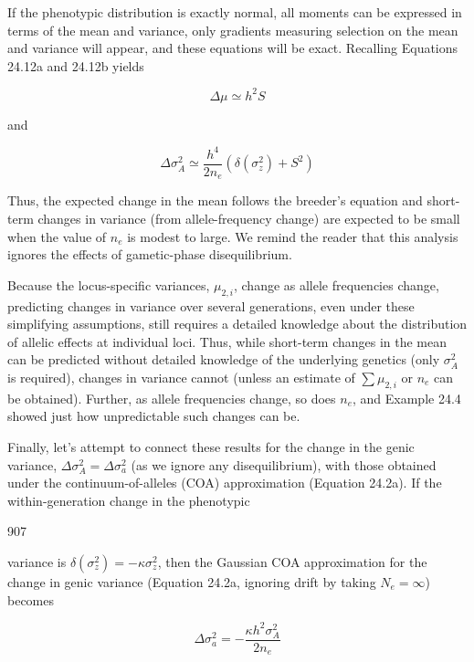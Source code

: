 \documentclass{article}
\begin{document}
If the phenotypic distribution is exactly normal, all moments can be expressed in terms of the mean and variance, only gradients measuring selection on the mean and variance will appear, and these equations will be exact. Recalling Equations 24.12a and 24.12b yields

\begin{equation}
\Delta\mu\simeq h^{2}S
\tag{24.30b}
\label{eq:24_30b}
\end{equation}

and

\begin{equation}
\Delta\sigma_{A}^{2}\simeq\frac{h^{4}}{2n_{e}}\left(\delta(\sigma_{z}^{2})+S^{2}\right)
\tag{24.30c}
\label{eq:24_30c}
\end{equation}

Thus, the expected change in the mean follows the breeder's equation and short-term changes in variance (from allele-frequency change) are expected to be small when the value of  $ n_{e} $ is modest to large. We remind the reader that this analysis ignores the effects of gametic-phase disequilibrium.

Because the locus-specific variances,  $ \mu_{2,i} $, change as allele frequencies change, predicting changes in variance over several generations, even under these simplifying assumptions, still requires a detailed knowledge about the distribution of allelic effects at individual loci. Thus, while short-term changes in the mean can be predicted without detailed knowledge of the underlying genetics (only  $ \sigma_{A}^{2} $ is required), changes in variance cannot (unless an estimate of  $ \sum \mu_{2,i} $ or  $ n_{e} $ can be obtained). Further, as allele frequencies change, so does  $ n_{e} $, and Example 24.4 showed just how unpredictable such changes can be.

Finally, let's attempt to connect these results for the change in the genic variance,  $ \Delta\sigma_A^2 = \Delta\sigma_a^2 $ (as we ignore any disequilibrium), with those obtained under the continuum-of-alleles (COA) approximation (Equation 24.2a). If the within-generation change in the phenotypic

907

variance is  $ \delta(\sigma_{z}^{2}) = -\kappa\sigma_{z}^{2} $, then the Gaussian COA approximation for the change in genic variance (Equation 24.2a, ignoring drift by taking  $ N_{e} = \infty $) becomes

\begin{equation}
\Delta\sigma_{a}^{2}=-\frac{\kappa h^{2}\sigma_{A}^{2}}{2n_{e}}
\tag{24.30d}
\label{eq:24_30d}
\end{equation}
\end{document}
